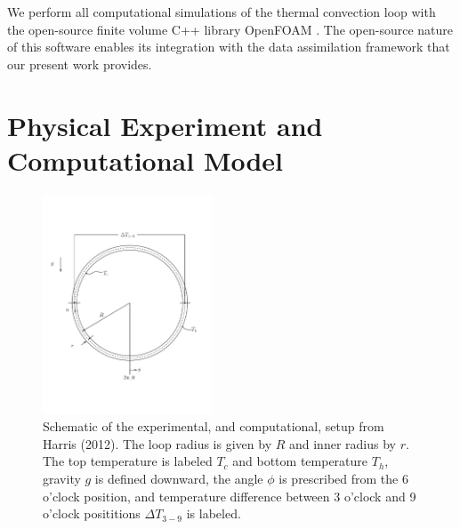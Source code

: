We perform all computational simulations of the thermal convection loop with the open-source finite volume C++ library OpenFOAM \cite{jasak2007}.
The open-source nature of this software enables its integration with the data assimilation framework that our present work provides.

\section{Physical Experiment and Computational Model}

\begin{figure}[t!]
  \centering
  \includegraphics[width=0.45\textwidth]{figures/harris-tellus-2012-loop.pdf}
  \caption[Schematic of the experimental, and computational, setup from Harris \etal (2012)]{
    Schematic of the experimental, and computational, setup from Harris \etal (2012).
    The loop radius is given by $R$ and inner radius by $r$.
    The top temperature is labeled $T_c$ and bottom temperature $T_h$, gravity $g$ is defined downward, the angle $\phi$ is prescribed from the 6 o'clock position, and temperature difference between 3 o'clock and 9 o'clock posititions $\Delta T_{3-9}$ is labeled.
  }
  \label{fig:thermosyphon-schematic}
\end{figure}

